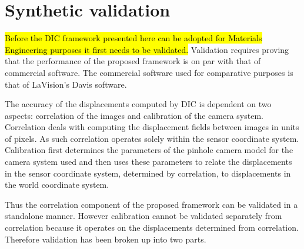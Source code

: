 \documentclass[12pt,oneside,openany,a4paper, %
english, %
masters-t, goldenblock]{usthesis}
\begin{document}





\chapter{Synthetic validation}
\label{ch: synthetic validation}
\hl{Before the DIC framework presented here can be adopted for Materials Engineering purposes it first needs to be validated.}  Validation requires proving that the performance of the proposed framework is on par with that of commercial software. The commercial software used for comparative purposes is that of LaVision's Davis software.

The accuracy of the displacements computed by DIC is dependent on two aspects: correlation of the images and calibration of the camera system. Correlation deals with computing the displacement fields between images in units of pixels. As such correlation operates solely within the sensor coordinate system. Calibration first determines the parameters of the pinhole camera model for the camera system used and then uses these parameters to relate the displacements in the sensor coordinate system, determined by correlation, to displacements in the world coordinate system. 

Thus the correlation component of the proposed framework can be validated in a standalone manner. However calibration cannot be validated separately from correlation because it operates on the displacements determined from correlation. Therefore validation has been broken up into two parts.
\end{document}

